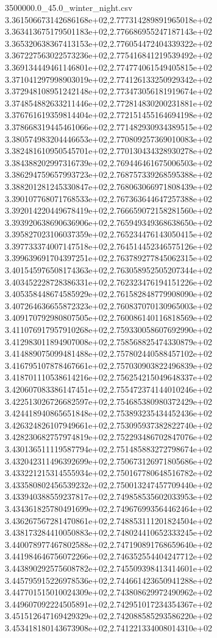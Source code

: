 \begin{filecontents*}{3500000.0_45.0_winter_night.csv}
3.361506673142686168e+02,2.777314289891965018e+02
3.363413675179501183e+02,2.776686955247187143e+02
3.365320638367413153e+02,2.776054472404339322e+02
3.367227563022573236e+02,2.775416841219539492e+02
3.369134449461146801e+02,2.774774061549405815e+02
3.371041297998903019e+02,2.774126133250929342e+02
3.372948108951242148e+02,2.773473056181919674e+02
3.374854882633211446e+02,2.772814830200231881e+02
3.376761619359814404e+02,2.772151455164694198e+02
3.378668319445461066e+02,2.771482930934389515e+02
3.380574983204446653e+02,2.770809257369010083e+02
3.382481610950545701e+02,2.770130434328930278e+02
3.384388202997316739e+02,2.769446461675006503e+02
3.386294759657993723e+02,2.768757339268595388e+02
3.388201281245330847e+02,2.768063066971808439e+02
3.390107768071768533e+02,2.767363644647257388e+02
3.392014220449678419e+02,2.766659072158281560e+02
3.393920638690636906e+02,2.765949349368638650e+02
3.395827023106037359e+02,2.765234476143050415e+02
3.397733374007147518e+02,2.764514452346575126e+02
3.399639691704397251e+02,2.763789277845062315e+02
3.401545976508174363e+02,2.763058952505207344e+02
3.403452228728386331e+02,2.762323476194151226e+02
3.405358448674585929e+02,2.761582848779908090e+02
3.407264636655872323e+02,2.760837070130965003e+02
3.409170792980807505e+02,2.760086140116818569e+02
3.411076917957910268e+02,2.759330058607692990e+02
3.412983011894907008e+02,2.758568825474330879e+02
3.414889075099481488e+02,2.757802440588457102e+02
3.416795107878467661e+02,2.757030903822496839e+02
3.418701110538614216e+02,2.756254215049648337e+02
3.420607083386147451e+02,2.755472374144010246e+02
3.422513026726682597e+02,2.754685380980372429e+02
3.424418940865651848e+02,2.753893235434452436e+02
3.426324826107949661e+02,2.753095937382822740e+02
3.428230682757974819e+02,2.752293486702847076e+02
3.430136511119587794e+02,2.751485883272798674e+02
3.432042311496392699e+02,2.750673126971805686e+02
3.433221215314555934e+02,2.750167780648516782e+02
3.433580802456539232e+02,2.750013247457709440e+02
3.433940388559237817e+02,2.749858535602033953e+02
3.434361825780491699e+02,2.749676993564462464e+02
3.436267567281470861e+02,2.748853111201824504e+02
3.438173284410050883e+02,2.748024410652333245e+02
3.440078977467802588e+02,2.747190891768659640e+02
3.441984646756072266e+02,2.746352554404247712e+02
3.443890292575608782e+02,2.745509398413414601e+02
3.445795915226978536e+02,2.744661423650941288e+02
3.447701515010024309e+02,2.743808629972490962e+02
3.449607092224505891e+02,2.742951017234354367e+02
3.451512647169429329e+02,2.742088585293586220e+02
3.453418180143673908e+02,2.741221334008014310e+02

\end{filecontents*}
